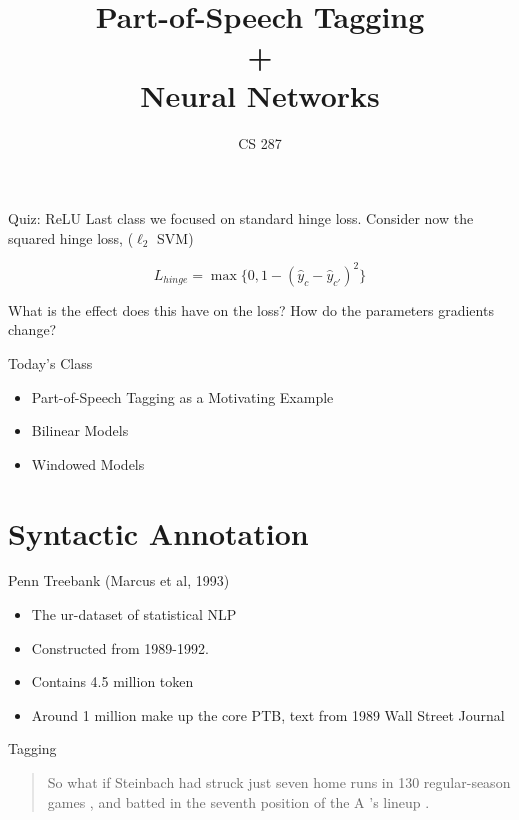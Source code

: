 \documentclass{beamer}
\title{Part-of-Speech Tagging \\ + \\ Neural Networks}
\date{}
\author{CS 287}
\begin{document}
\begin{frame}
  \titlepage
\end{frame}


\begin{frame}{Quiz: ReLU}
  Last class we focused on standard hinge loss.
  Consider now the squared hinge loss, ($\ell_2$ SVM)

  \[L_{hinge} = \max\{0, 1 - (\hat{y}_c - \hat{y}_{c'})^2 \} \]

  What is the effect does this have on the loss?
  How do the parameters gradients change?
\end{frame}


\begin{frame}{Today's Class}
  \begin{itemize}
  \item Part-of-Speech Tagging as a Motivating Example
    \air

  \item Bilinear Models
    \air

  \item Windowed Models
  \end{itemize}
\end{frame}

\section{Syntactic Annotation}

\begin{frame}{Penn Treebank (Marcus et al, 1993)}
  \begin{itemize}
    \item The ur-dataset of statistical NLP
      \air
    \item Constructed from 1989-1992.
      \air
    \item Contains 4.5 million token
      \air
    \item Around 1 million make up the core PTB, text from 1989 Wall Street Journal
  \end{itemize}
\end{frame}

\begin{frame}{Tagging}
    \begin{quote}
So
what
if
Steinbach
had
struck
just
seven
home
runs
in
130
regular-season
games
,
and
batted
in
the
seventh
position
of
the
A
's
lineup
.
  \end{quote}

\end{frame}
\end{document}
